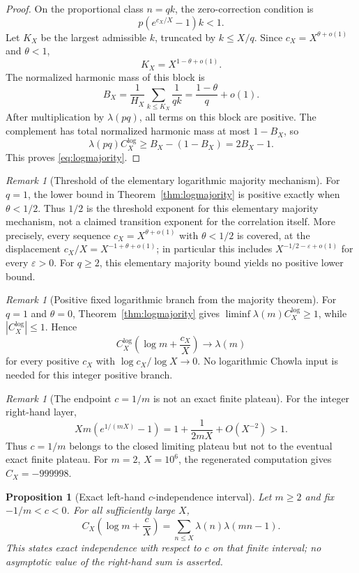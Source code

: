 \documentclass[preprint,12pt]{elsarticle}
\numberwithin{equation}{section}
\theoremstyle{plain}
\newtheorem{proposition}[theorem]{Proposition}
\theoremstyle{definition}
\theoremstyle{remark}
\newtheorem{remark}[theorem]{Remark}
\begin{document}
\begin{proof}
On the proportional class $n=qk$, the zero-correction condition is
\[
p(e^{c_X/X}-1)k<1.
\]
Let $K_X$ be the largest admissible $k$, truncated by $k\le X/q$. Since
$c_X=X^{\theta+o(1)}$ and $\theta<1$,
\[
K_X=X^{1-\theta+o(1)}.
\]
The normalized harmonic mass of this block is
\[
B_X=
\frac1{H_X}\sum_{k\le K_X}\frac1{qk}
=
\frac{1-\theta}{q}+o(1).
\]
After multiplication by $\lambda(pq)$, all terms on this block are positive.
The complement has total normalized harmonic mass at most $1-B_X$, so
\[
\lambda(pq)C_X^{\log}\ge B_X-(1-B_X)=2B_X-1.
\]
This proves \eqref{eq:logmajority}.
\end{proof}

\begin{remark}[Threshold of the elementary logarithmic majority mechanism]
For $q=1$, the lower bound in Theorem~\ref{thm:logmajority} is positive
exactly when $\theta<1/2$. Thus $1/2$ is the threshold exponent for this
elementary majority mechanism, not a claimed transition exponent for the
correlation itself. More precisely, every sequence
$c_X=X^{\theta+o(1)}$ with $\theta<1/2$ is covered, at the displacement
$c_X/X=X^{-1+\theta+o(1)}$; in particular this includes
$X^{-1/2-\varepsilon+o(1)}$ for every $\varepsilon>0$.
For $q\ge2$, this elementary majority bound yields no positive lower bound.
\end{remark}

\begin{remark}[Positive fixed logarithmic branch from the majority theorem]
For $q=1$ and $\theta=0$, Theorem~\ref{thm:logmajority} gives
$\liminf\lambda(m)C_X^{\log}\ge1$, while $|C_X^{\log}|\le1$. Hence
\[
C_X^{\log}\!\left(\log m+\frac{c_X}{X}\right)\to\lambda(m)
\]
for every positive $c_X$ with $\log c_X/\log X\to0$. No logarithmic Chowla
input is needed for this integer positive branch.
\end{remark}

\begin{remark}[The endpoint $c=1/m$ is not an exact finite plateau]
For the integer right-hand layer,
\[
Xm(e^{1/(mX)}-1)
=
1+\frac1{2mX}+O(X^{-2})>1.
\]
Thus $c=1/m$ belongs to the closed limiting plateau but not to the eventual
exact finite plateau. For $m=2$, $X=10^6$, the regenerated computation gives
$C_X=-999998$.
\end{remark}

\begin{proposition}[Exact left-hand $c$-independence interval]
\label{prop:left}
Let $m\ge2$ and fix $-1/m<c<0$. For all sufficiently large $X$,
\[
C_X\!\left(\log m+\frac cX\right)
=
\sum_{n\le X}\lambda(n)\lambda(mn-1).
\]
This states exact independence with respect to $c$ on that finite interval;
no asymptotic value of the right-hand sum is asserted.
\end{proposition}
\end{document}
